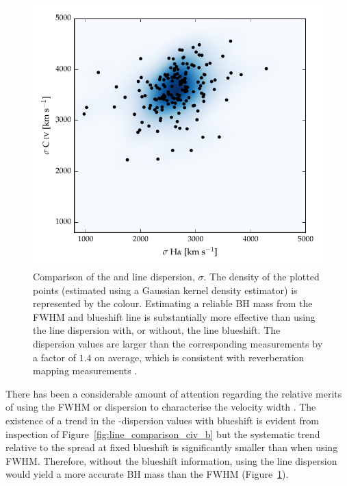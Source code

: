 \begin{figure}[h!]
    \centering 
    \includegraphics[width=0.8\columnwidth]{figures/chapter03/dispersion_comparison.pdf} 
    \caption[{Comparison of the  and \ha line dispersion, $\sigma$.}]{Comparison of the  and \ha line dispersion, $\sigma$. The density of the plotted points (estimated using a Gaussian kernel density estimator) is represented by the colour. Estimating a reliable BH mass from the  FWHM and blueshift line is substantially more effective than using the  line dispersion with, or without, the line blueshift. The  dispersion values are larger than the corresponding \ha measurements by a factor of $1.4$ on average, which is consistent with reverberation mapping measurements \citep{vestergaard06}.} 
    \label{fig:dispersion_comparison}
\end{figure}

There has been a considerable amount of attention regarding the relative merits of using the FWHM or dispersion to characterise the velocity width \citep[e.g.][]{denney13}.
The existence of a trend in the -dispersion values with  blueshift is evident from inspection of Figure~\ref{fig:line_comparison_civ_b} but the systematic trend relative to the spread at fixed blueshift is significantly smaller than when using  FWHM. 
Therefore, without the blueshift information, using the line dispersion would yield a more accurate BH mass than the FWHM (Figure~\ref{fig:dispersion_comparison}). 

